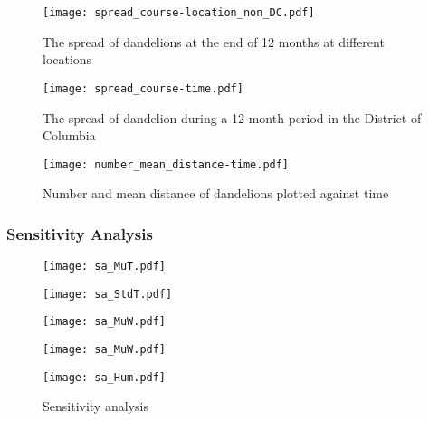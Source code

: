 \documentclass[12pt]{article}
\begin{document}
			\begin{figure}
				\centering
				\texttt{[image: spread\_course-location\_non\_DC.pdf]}
				\caption{The spread of dandelions at the end of 12 months at different locations}
				\label{fig:scatter5loc}
			\end{figure}
					
			\begin{figure}
				\centering
				\texttt{[image: spread\_course-time.pdf]}
				\caption{The spread of dandelion during a 12-month period in the District of Columbia}
				\label{fig:spreadDC}
			\end{figure}
					
			\begin{figure}
				\centering
				\texttt{[image: number\_mean\_distance-time.pdf]}
				\caption{Number and mean distance of dandelions plotted against time}
				\label{fig:time}
			\end{figure}
		
		\subsubsection{Sensitivity Analysis}
		
			\begin{figure}
				\centering
				\begin{minipage}{0.04\textwidth}\end{minipage}
				\begin{minipage}{0.46\textwidth}
					\texttt{[image: sa\_MuT.pdf]}
				\end{minipage}
				\begin{minipage}{0.46\textwidth}
					\texttt{[image: sa\_StdT.pdf]}
				\end{minipage}
				\begin{minipage}{0.04\textwidth}\end{minipage}
				
				\begin{minipage}{0.04\textwidth}\end{minipage}
				\begin{minipage}{0.46\textwidth}
					\texttt{[image: sa\_MuW.pdf]}
				\end{minipage}
				\begin{minipage}{0.46\textwidth}
					\texttt{[image: sa\_MuW.pdf]}
				\end{minipage}
				\begin{minipage}{0.04\textwidth}\end{minipage}
				
				\texttt{[image: sa\_Hum.pdf]}
				\caption{Sensitivity analysis}
				\label{fig:sa}
			\end{figure}
			
\end{document}
